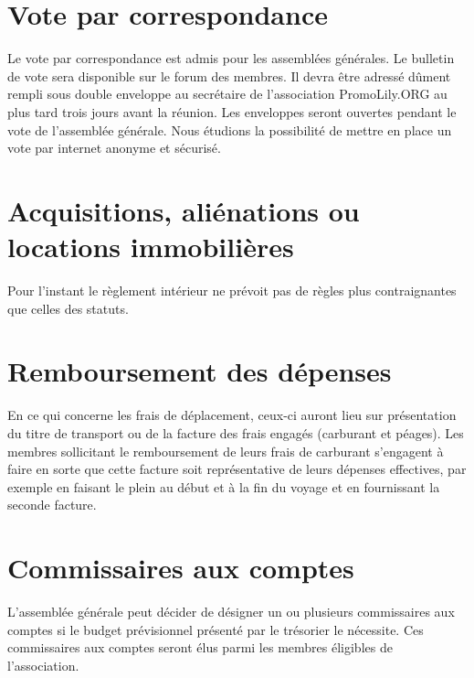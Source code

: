 \documentclass[a4wide,12pt]{scrartcl}
\newcommand{\qui}{PromoLily.ORG\xspace}
\begin{document}
\section{Vote par correspondance}
Le vote par correspondance est admis pour les assemblées générales. Le
bulletin de vote sera disponible sur le forum des membres. Il devra
être adressé dûment rempli sous double enveloppe au secrétaire de
l'association \qui au plus tard trois jours avant la réunion.
Les enveloppes seront ouvertes pendant le vote de l'assemblée
générale. Nous étudions la possibilité de mettre en place un vote par
internet anonyme et sécurisé.


\section{Acquisitions, aliénations ou locations immobilières}
Pour l'instant le règlement intérieur ne prévoit pas de règles plus
contraignantes que celles des statuts.


\section{Remboursement des dépenses}
En ce qui concerne les frais de déplacement, ceux-ci auront lieu sur
présentation du titre de transport ou de la facture des frais engagés
(carburant et péages). Les membres sollicitant le remboursement de
leurs frais de carburant s'engagent à faire en sorte que cette facture
soit représentative de leurs dépenses effectives, par exemple en
faisant le plein au début et à la fin du voyage et en fournissant la
seconde facture.


\section{Commissaires aux comptes}
L'assemblée générale peut décider de désigner un ou plusieurs
commissaires aux comptes si le budget prévisionnel présenté par le
trésorier le nécessite. Ces commissaires aux comptes seront élus parmi
les membres éligibles de l'association.
\end{document}

